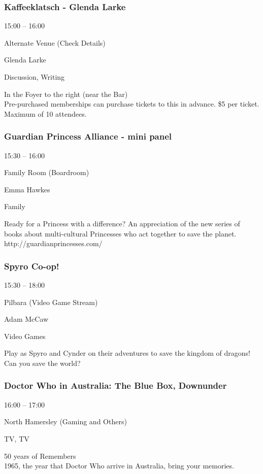 \documentclass{scrreprt}
\begin{document}
\begin{multicols}{2}
\subsubsection*{Kaffeeklatsch - Glenda Larke}\begin{description}
\setlength{\itemsep}{0pt}
\setlength{\parsep}{0pt}
\setlength{\parskip}{0pt}
\item[Time:]{15:00 -- 16:00}
\item[Venue:]{Alternate Venue (Check Details)}
\item[People:]{Glenda Larke}
\item[Tags:]{Discussion, Writing}\end{description}
In the Foyer to the right (near the Bar) \\Pre-purchased memberships can purchase tickets to this in advance. \$5 per ticket. Maximum of 10 attendees.
\subsubsection*{Guardian Princess Alliance - mini panel}\begin{description}
\setlength{\itemsep}{0pt}
\setlength{\parsep}{0pt}
\setlength{\parskip}{0pt}
\item[Time:]{15:30 -- 16:00}
\item[Venue:]{Family Room (Boardroom)}
\item[People:]{Emma Hawkes}
\item[Tags:]{Family}\end{description}
Ready for a Princess with a difference? An appreciation of the new series of books about multi-cultural Princesses who act together to save the planet.~\\http://guardianprincesses.com/
\subsubsection*{Spyro Co-op!}\begin{description}
\setlength{\itemsep}{0pt}
\setlength{\parsep}{0pt}
\setlength{\parskip}{0pt}
\item[Time:]{15:30 -- 18:00}
\item[Venue:]{Pilbara (Video Game Stream)}
\item[People:]{Adam McCaw}
\item[Tags:]{Video Games}\end{description}
Play as Spyro and Cynder on their adventures to save the kingdom of dragons! Can you save the world?
\subsubsection*{Doctor Who in Australia: The Blue Box, Downunder}\begin{description}
\setlength{\itemsep}{0pt}
\setlength{\parsep}{0pt}
\setlength{\parskip}{0pt}
\item[Time:]{16:00 -- 17:00}
\item[Venue:]{North Hamersley (Gaming and Others)}
\item[Tags:]{TV, TV}\end{description}
50 years of Remembers\\1965, the year that Doctor Who arrive in Australia, bring your memories.

\end{multicols}
\end{document}
